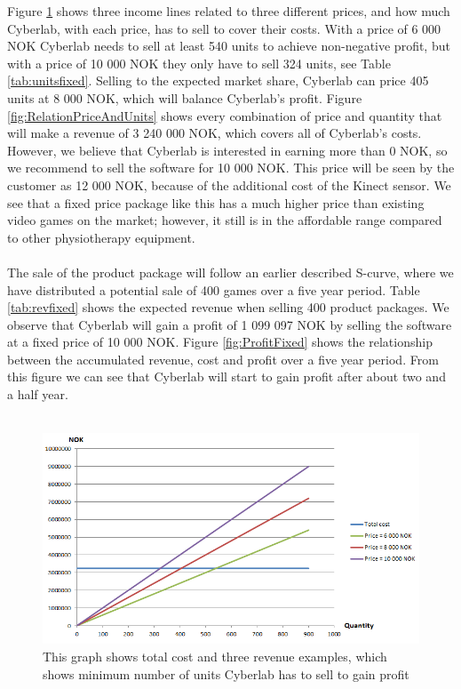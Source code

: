 Figure \ref{fig:RevenueStreamQuantity} shows three income lines related to three different prices, and how much Cyberlab, with each price, has to sell to cover their costs. With a price of 6 000 NOK Cyberlab needs to sell at least 540 units to achieve non-negative profit, but with a price of 10 000 NOK they only have to sell 324 units, see Table \ref{tab:unitsfixed}. Selling to the expected market share, Cyberlab can price 405 units at 8 000 NOK, which will balance Cyberlab's profit. Figure \ref{fig:RelationPriceAndUnits} shows every combination of price and quantity that will make a revenue of 3 240 000 NOK, which covers all of Cyberlab's costs. However, we believe that Cyberlab is interested in earning more than 0 NOK, so we recommend to sell the software for 10 000 NOK. This price will be seen by the customer as 12 000 NOK, because of the additional cost of the Kinect sensor. We see that a fixed price package like this has a much higher price than existing video games on the market; however, it still is in the affordable range compared to other physiotherapy equipment. \\ \\
The sale of the product package will follow an earlier described S-curve, where we have distributed a potential sale of 400 games over a five year period. Table \ref{tab:revfixed} shows the expected revenue when selling 400 product packages. We observe that Cyberlab will gain a profit of 1 099 097 NOK by selling the software at a fixed price of 10 000 NOK. Figure \ref{fig:ProfitFixed} shows the relationship between the accumulated revenue, cost and profit over a five year period. From this figure we can see that Cyberlab will start to gain profit after about two and a half year. \\ \\
\begin{figure}
\begin{center}
\includegraphics[scale=0.7]{revenuestreamquantity}
\caption[Quantity examples]{This graph shows total cost and three revenue examples, which shows minimum number of units Cyberlab has to sell to gain profit}
\label{fig:RevenueStreamQuantity}
\end{center}
\end{figure}
